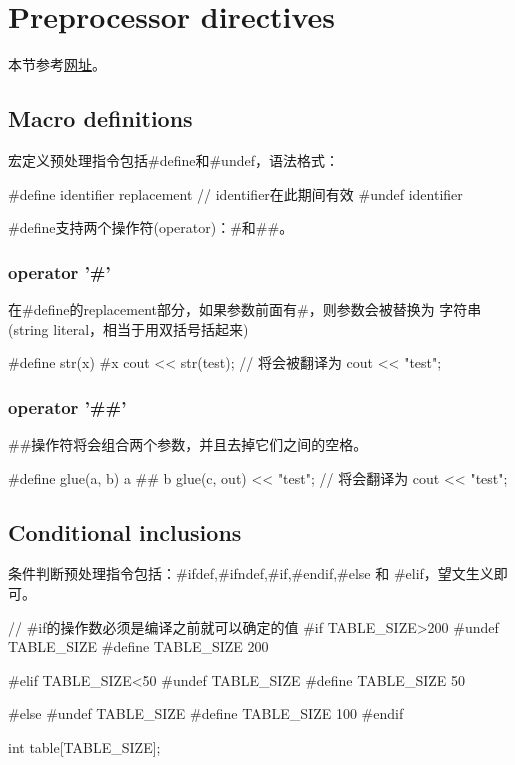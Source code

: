 \section[Preprocessor directives]{Preprocessor directives}
本节参考\href{http://www.cplusplus.com/doc/tutorial/preprocessor/}{网址}。

\subsection[\#define,\#undef]{Macro definitions}
宏定义预处理指令包括\#define和\#undef，语法格式：

\begin{cppcode}
#define identifier replacement
// identifier在此期间有效
#undef identifier
\end{cppcode}

\#define支持两个操作符(operator)：\#和\#\#。

\subsubsection[operator '\#']{operator '\#'}
在\#define的replacement部分，如果参数前面有\#，则参数会被替换为
字符串(string literal，相当于用双括号括起来)

\begin{cppcode}
#define str(x) #x
cout << str(test);
// 将会被翻译为
cout << "test";
\end{cppcode}

\subsubsection[operator '\#\#']{operator '\#\#'}
\#\#操作符将会组合两个参数，并且去掉它们之间的空格。

\begin{cppcode}
#define glue(a, b) a ## b
glue(c, out) << "test";
// 将会翻译为
cout << "test";
\end{cppcode}

\subsection[\#ifdef,\#ifndef,\#if,\#endif,\#else and \#elif]{Conditional inclusions}
条件判断预处理指令包括：\#ifdef,\#ifndef,\#if,\#endif,\#else 和 \#elif，望文生义即可。

\begin{cppcode}
// #if的操作数必须是编译之前就可以确定的值
#if TABLE_SIZE>200
#undef TABLE_SIZE
#define TABLE_SIZE 200

#elif TABLE_SIZE<50
#undef TABLE_SIZE
#define TABLE_SIZE 50

#else
#undef TABLE_SIZE
#define TABLE_SIZE 100
#endif

int table[TABLE_SIZE];
\end{cppcode}

